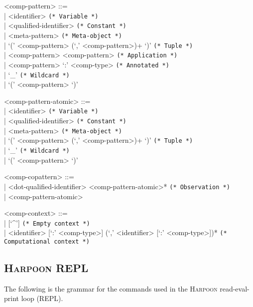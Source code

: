 \documentclass[11pt]{article}
\newcommand{\Harpoon}{\textsc{Harpoon}\xspace}
\begin{document}
\begin{grammar}
<comp-pattern> ::= \hfill\\
| <identifier> \hfill \texttt{(* Variable *)}\\
| <qualified-identifier> \hfill \texttt{(* Constant *)}\\
| <meta-pattern> \hfill \texttt{(* Meta-object *)} \\
| `(' <comp-pattern> (`,' <comp-pattern>)+ `)' \hfill \texttt{(* Tuple *)}\\
| <comp-pattern> <comp-pattern> \hfill \texttt{(* Application *)}\\
| <comp-pattern> `:' <comp-type> \hfill \texttt{(* Annotated *)}\\
| `_' \hfill \texttt{(* Wildcard *)}\\
| `(' <comp-pattern> `)'

<comp-pattern-atomic> ::= \hfill\\
| <identifier> \hfill \texttt{(* Variable *)}\\
| <qualified-identifier> \hfill \texttt{(* Constant *)}\\
| <meta-pattern> \hfill \texttt{(* Meta-object *)} \\
| `(' <comp-pattern> (`,' <comp-pattern>)+ `)' \hfill \texttt{(* Tuple *)}\\
| `_' \hfill \texttt{(* Wildcard *)}\\
| `(' <comp-pattern> `)'

<comp-copattern> ::= \hfill\\
| <dot-qualified-identifier> <comp-pattern-atomic>* \hfill \texttt{(* Observation *)}\\
| <comp-pattern-atomic>

<comp-context> ::= \hfill\\
| [`^'] \hfill \texttt{(* Empty context *)}\\
| <identifier> [`:' <comp-type>] (`,' <identifier> [`:' <comp-type>])* \hfill \texttt{(* Computational context *)}
\end{grammar}

\subsection{\Harpoon REPL}\label{section:syntax-harpoon-repl}

The following is the grammar for the commands used in the \Harpoon read-eval-print loop (REPL).
\end{document}
